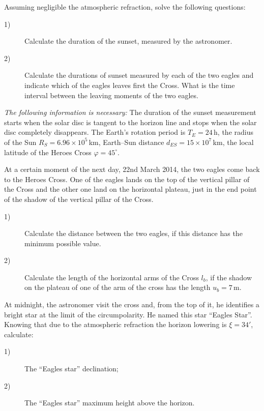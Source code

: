 \begin{description}
  Assuming negligible the atmospheric refraction, solve the following
  questions:
  \begin{description}
  \item[1)] Calculate the duration of the sunset, measured by the astronomer.
  \item[2)] Calculate the durations of sunset measured by each of the two
    eagles and indicate which of the eagles leaves first the Cross. What is
    the time interval between the leaving moments of the two eagles.
  \end{description}
  \emph{The following information is necessary:} The duration of the sunset
  measurement starts when the solar disc is tangent to the horizon line and
  stops when the solar disc completely disappears. The Earth's rotation period
  is $T_E = 24$\,h, the radius of the Sun $R_S = 6.96 \times 10^{5}$\,km,
  Earth--Sun distance $d_{ES} = 15 \times 10^{7}$\,km, the local latitude of
  the Heroes Cross $\varphi = 45^\circ$.
\item[B)] At a certain moment of the next day, 22nd March 2014, the two eagles
  come back to the Heroes Cross. One of the eagles lands on the top of the
  vertical pillar of the Cross and the other one land on the horizontal
  plateau, just in the end point of the shadow of the vertical pillar of the
  Cross.
  \begin{description}
  \item[1)] Calculate the distance between the two eagles, if this distance
    has the minimum possible value.
  \item[2)] Calculate the length of the horizontal arms of the Cross $l_b$, if
    the shadow on the plateau of one of the arm of the cross has the length
    $u_b = 7$\,m.
  \end{description}
\item[C)] At midnight, the astronomer visit the cross and, from the top of it,
  he identifies a bright star at the limit of the circumpolarity. He named
  this star ``Eagles Star''. Knowing that due to the atmospheric refraction
  the horizon lowering is $\xi = 34'$, calculate:
  \begin{description}
  \item[1)] The ``Eagles star'' declination;
  \item[2)] The ``Eagles star'' maximum height above the horizon.
  \end{description}
\end{description}
